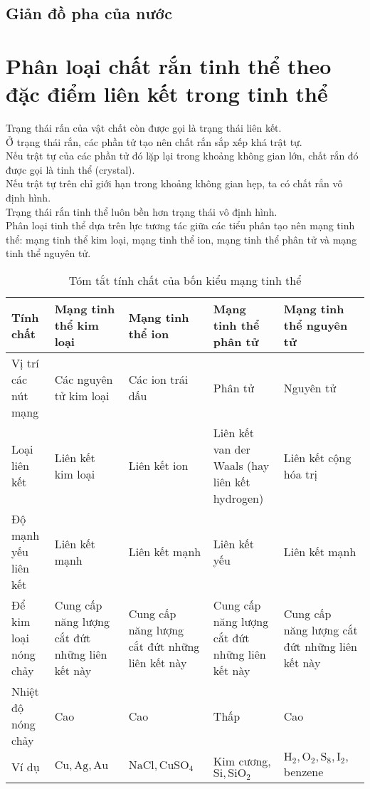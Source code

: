 \subsection{Giản đồ pha của nước}
\section{Phân loại chất rắn tinh thể theo đặc điểm liên kết trong tinh thể}
Trạng thái rấn của vật chất còn được gọi là trạng thái liên kết.\\
Ở trạng thái rắn, các phần tử tạo nên chất rắn sắp xếp khá trật tự.\\
Nếu trật tự của các phần tử đó lặp lại trong khoảng không gian lớn, chất rắn đó được gọi là tinh thể (crystal).\\
Nếu trật tự trên chỉ giới hạn trong khoảng không gian hẹp, ta có chất rắn vô định hình.\\
Trạng thái rắn tinh thể luôn bền hơn trạng thái vô định hình.\\
Phân loại tinh thể dựa trên lực tương tác giữa các tiểu phân tạo nên mạng tinh thể: mạng tinh thể kim loại, mạng tinh thể ion, mạng tinh thể phân tử và mạng tinh thể nguyên tử.
\begin{table}[H]
\begin{tabular}{ | p{} |
                   p{} |
                   p{} |
                   p{} | 
                   p{} |} \hline
\hline 
Tính chất & Mạng tinh thể kim loại & Mạng tinh thể ion & Mạng tinh thể phân tử & Mạng tinh thể nguyên tử \\ 
\hline 
Vị trí các nút mạng & Các nguyên tử kim loại & Các ion trái dấu & Phân tử & Nguyên tử \\ 
\hline 
Loại liên kết & Liên kết kim loại & Liên kết ion & Liên kết van der Waals (hay liên kết hydrogen) & Liên kết cộng hóa trị \\ 
\hline 
Độ mạnh yếu liên kết & Liên kết mạnh & Liên kết mạnh & Liên kết yếu & Liên kết mạnh \\ 
\hline 
Để kim loại nóng chảy & Cung cấp năng lượng cắt đứt những liên kết này & Cung cấp năng lượng cắt đứt những liên kết này & Cung cấp năng lượng cắt đứt những liên kết này & Cung cấp năng lượng cắt đứt những liên kết này \\ 
\hline 
Nhiệt độ nóng chảy & Cao & Cao & Thấp & Cao \\ 
\hline 
Ví dụ & $\mathrm{Cu}, \mathrm{Ag}, \mathrm{Au}$ & $\mathrm{NaCl}, \mathrm{CuSO_4}$ & Kim cương, $\mathrm{Si}, \mathrm{SiO_2}$ & $\mathrm{H_2}, \mathrm{O_2}, \mathrm{S_8}, \mathrm{I_2},$ benzene \\ 
\hline 
\end{tabular}
\caption{Tóm tắt tính chất của bốn kiểu mạng tinh thể}
\end{table} 
